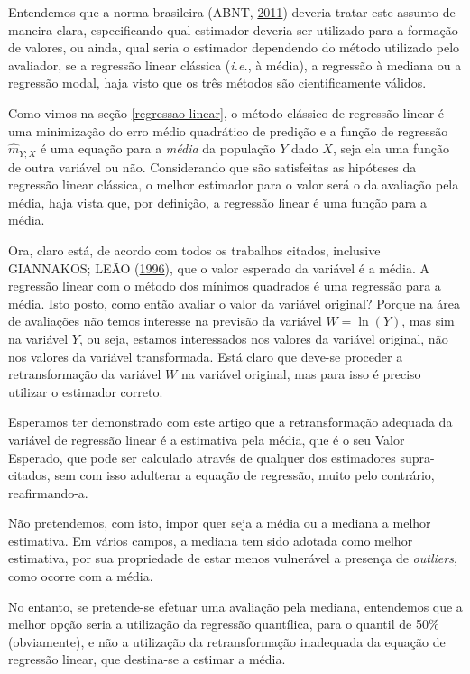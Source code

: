 \documentclass[a4paper, 12pt]{article}
\begin{document}
Entendemos que a norma brasileira (ABNT,
\protect\hyperlink{ref-NBR1465302}{2011}) deveria tratar este assunto de
maneira clara, especificando qual estimador deveria ser utilizado para a
formação de valores, ou ainda, qual seria o estimador dependendo do
método utilizado pelo avaliador, se a regressão linear clássica
(\emph{i.e.}, à média), a regressão à mediana ou a regressão modal, haja
visto que os três métodos são cientificamente válidos.

Como vimos na seção \ref{regressao-linear}, o método clássico de
regressão linear é uma minimização do erro médio quadrático de predição
e a função de regressão \(\hat{m}_{Y;X}\) é uma equação para a
\emph{média} da população \(Y\) dado \(X\), seja ela uma função de outra
variável ou não. Considerando que são satisfeitas as hipóteses da
regressão linear clássica, o melhor estimador para o valor será o da
avaliação pela média, haja vista que, por definição, a regressão linear
é uma função para a média.

Ora, claro está, de acordo com todos os trabalhos citados, inclusive
GIANNAKOS; LEÃO (\protect\hyperlink{ref-giannakos}{1996}), que o valor
esperado da variável é a média. A regressão linear com o método dos
mínimos quadrados é uma regressão para a média. Isto posto, como então
avaliar o valor da variável original? Porque na área de avaliações não
temos interesse na previsão da variável \(W = \ln(Y)\), mas sim na
variável \(Y\), ou seja, estamos interessados nos valores da variável
original, não nos valores da variável transformada. Está claro que
deve-se proceder a retransformação da variável \(W\) na variável
original, mas para isso é preciso utilizar o estimador correto.

Esperamos ter demonstrado com este artigo que a retransformação adequada
da variável de regressão linear é a estimativa pela média, que é o seu
Valor Esperado, que pode ser calculado através de qualquer dos
estimadores supra-citados, sem com isso adulterar a equação de
regressão, muito pelo contrário, reafirmando-a.

Não pretendemos, com isto, impor quer seja a média ou a mediana a melhor
estimativa. Em vários campos, a mediana tem sido adotada como melhor
estimativa, por sua propriedade de estar menos vulnerável a presença de
\emph{outliers}, como ocorre com a média.

No entanto, se pretende-se efetuar uma avaliação pela mediana,
entendemos que a melhor opção seria a utilização da regressão
quantílica, para o quantil de 50\% (obviamente), e não a utilização da
retransformação inadequada da equação de regressão linear, que
destina-se a estimar a média.
\end{document}
